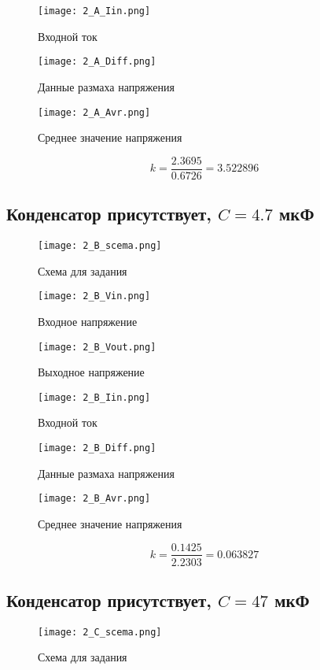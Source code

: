 \documentclass[a4paper,14pt]{article}
\begin{document}
\begin{figure}[H]
	\centering
	\texttt{[image: 2\_A\_Iin.png]}
	\caption{Входной ток}	
\end{figure}

\begin{figure}[H]
	\centering
	\texttt{[image: 2\_A\_Diff.png]}
	\caption{Данные размаха напряжения}	
\end{figure}

\begin{figure}[H]
	\centering
	\texttt{[image: 2\_A\_Avr.png]}
	\caption{Среднее значение напряжения}	
\end{figure}

$$k = \frac{2.3695}{0.6726} = 3.522896$$

\subsection{Конденсатор присутствует, $C = 4.7$ мкФ}
\begin{figure}[H]
	\centering
	\texttt{[image: 2\_B\_scema.png]}
	\caption{Схема для задания}	
\end{figure}

\begin{figure}[H]
	\centering
	\texttt{[image: 2\_B\_Vin.png]}
	\caption{Входное напряжение}	
\end{figure}

\begin{figure}[H]
	\centering
	\texttt{[image: 2\_B\_Vout.png]}
	\caption{Выходное напряжение}	
\end{figure}

\begin{figure}[H]
	\centering
	\texttt{[image: 2\_B\_Iin.png]}
	\caption{Входной ток}	
\end{figure}

\begin{figure}[H]
	\centering
	\texttt{[image: 2\_B\_Diff.png]}
	\caption{Данные размаха напряжения}	
\end{figure}

\begin{figure}[H]
	\centering
	\texttt{[image: 2\_B\_Avr.png]}
	\caption{Среднее значение напряжения}	
\end{figure}

$$k = \frac{0.1425}{2.2303} = 0.063827$$

\subsection{Конденсатор присутствует, $C = 47$ мкФ}
\begin{figure}[H]
	\centering
	\texttt{[image: 2\_C\_scema.png]}
	\caption{Схема для задания}	
\end{figure}
\end{document}
